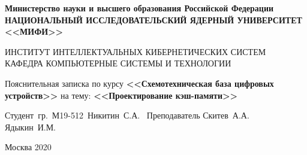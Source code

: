 \documentclass[13pt]{article}
\begin{document}
\begin{titlepage}                                                         
    \newpage                                                                        
    \begin{center}                                                        
    {\bfseries Министерство науки и высшего образования Российской Федерации \\
    НАЦИОНАЛЬНЫЙ ИССЛЕДОВАТЕЛЬСКИЙ ЯДЕРНЫЙ УНИВЕРСИТЕТ <<МИФИ>>}                               
    \vspace{1cm}                                                          
                                                  
    ИНСТИТУТ ИНТЕЛЛЕКТУАЛЬНЫХ КИБЕРНЕТИЧЕСКИХ СИСТЕМ\\
    КАФЕДРА КОМПЬЮТЕРНЫЕ СИСТЕМЫ И ТЕХНОЛОГИИ
    \vspace{6em}                                                          
    \end{center}                                                          
                                                                                        
    \vspace{1.2em}                                                        
                                                                                        
    \begin{center}                                                        
    \Large Пояснительная записка по курсу \linebreak \textbf{<<Схемотехническая база цифровых устройств>>} \linebreak
    на тему: \linebreak
    \textbf{<<Проектирование кэш-памяти>>}
    \end{center}                                                          
    \vspace{20em}                                                                           
    \vbox{%
    \hfill%
    \vbox{%
    \hbox{Студент гр. М19-512 Никитин С.А. \underline{\hspace{3cm}}}
    \hbox{Преподаватель}
    \hbox{Скитев А.А. \underline{\hspace{3cm}}}
    \hbox{Ядыкин И.М.  \underline{\hspace{3cm}}}
    }%
    }                                                          
    \vspace{\fill}                                                    
                                                                                        
    \begin{center}                                                        
    Москва 2020                                                               
    \end{center}                                                          
                                                                                        
    \end{titlepage} 
\end{document}
